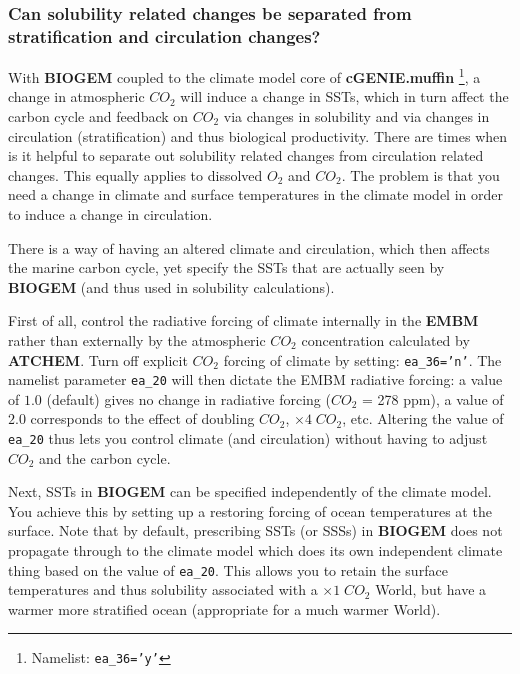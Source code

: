 \documentclass[11pt,fleqn]{book} %
\begin{document}
%
\subsubsection{Can  solubility related changes be separated from stratification and circulation changes?}

With \textbf{BIOGEM} coupled to the climate model core of \textbf{cGENIE.muffin} \footnote{Namelist: \texttt{ea\_36='y'}}, a change in atmospheric \(CO_{2}\) will induce a change in SSTs, which in turn affect the carbon cycle and feedback on \(CO_{2}\) via changes in solubility and via changes in circulation (stratification) and thus biological productivity. There are times when is it helpful to separate out solubility related changes from circulation related changes. This equally applies to dissolved \(O_{2}\) and \(CO_{2}\). The problem is that you need a change in climate and surface temperatures in the climate model in order to induce a change in circulation.

There is a way of having an altered climate and circulation, which then affects the marine carbon cycle, yet specify the SSTs that are actually seen by \textbf{BIOGEM} (and thus used in solubility calculations).

First of all, control the radiative forcing of climate internally in the \textbf{EMBM} rather than externally by the atmospheric \(CO_{2}\) concentration calculated by \textbf{ATCHEM}. Turn off explicit \(CO_{2}\) forcing of climate by setting: \texttt{ea\_36='n'}. The namelist parameter \texttt{ea\_20} will then dictate the EMBM radiative forcing: a value of \(1.0\) (default) gives no change in radiative forcing (\(CO_{2}\) = 278 ppm), a value of \(2.0\) corresponds to the effect of doubling \(CO_{2}\), \(\times  4\;CO_{2}\), etc. Altering the value of \texttt{ea\_20} thus lets you control climate (and circulation) without having to adjust \(CO_{2}\) and the carbon cycle.

Next, SSTs in \textbf{BIOGEM} can be specified independently of the climate model. You achieve this by setting up a restoring forcing of ocean temperatures at the surface. Note that by default, prescribing SSTs (or SSSs) in \textbf{BIOGEM} does not propagate through to the climate model which does its own independent climate thing based on the value of \texttt{ea\_20}. This allows you to retain the surface temperatures and thus solubility associated with a \(\times  1\;CO_{2}\) World, but have a warmer more stratified ocean (appropriate for a much warmer World).
\end{document}
